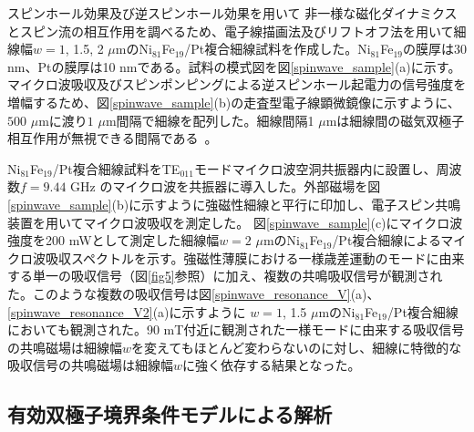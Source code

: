 スピンホール効果及び逆スピンホール効果を用いて
非一様な磁化ダイナミクスとスピン流の相互作用を調べるため、電子線描画法及びリフトオフ法を用いて細線幅$w=1$, 1.5, 2 $\mu$mのNi$_{81}$Fe$_{19}$/Pt複合細線試料を作成した。Ni$_{81}$Fe$_{19}$の膜厚は30 nm、Ptの膜厚は10 nmである。試料の模式図を図\ref{spinwave_sample}(a)に示す。マイクロ波吸収及びスピンポンピングによる逆スピンホール起電力の信号強度を増幅するため、図\ref{spinwave_sample}(b)の走査型電子線顕微鏡像に示すように、$500$ $\mu$mに渡り$1$ $\mu$m間隔で細線を配列した。細線間隔1 $\mu$mは細線間の磁気双極子相互作用が無視できる間隔である~\cite{Mathieu,Jorzick}。



Ni$_{81}$Fe$_{19}$/Pt複合細線試料をTE$_{011}$モードマイクロ波空洞共振器内に設置し、周波数$f=9.44$ GHz のマイクロ波を共振器に導入した。外部磁場を図\ref{spinwave_sample}(b)に示すように強磁性細線と平行に印加し、電子スピン共鳴装置を用いてマイクロ波吸収を測定した。
図\ref{spinwave_sample}(c)にマイクロ波強度を200 mWとして測定した細線幅$w=2$ $\mu$mのNi$_{81}$Fe$_{19}$/Pt複合細線によるマイクロ波吸収スペクトルを示す。強磁性薄膜における一様歳差運動のモードに由来する単一の吸収信号（図\ref{fig5}参照）に加え、複数の共鳴吸収信号が観測された。このような複数の吸収信号は図\ref{spinwave_resonance_V}(a)、\ref{spinwave_resonance_V2}(a)に示すように
$w=1$, 1.5 $\mu$mのNi$_{81}$Fe$_{19}$/Pt複合細線においても観測された。90 mT付近に観測された一様モードに由来する吸収信号の共鳴磁場は細線幅$w$を変えてもほとんど変わらないのに対し、細線に特徴的な吸収信号の共鳴磁場は細線幅$w$に強く依存する結果となった。





\subsection{有効双極子境界条件モデルによる解析}




